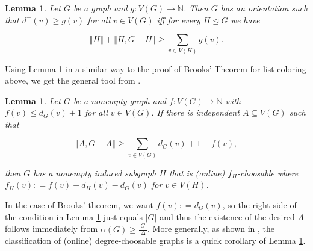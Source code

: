 \documentclass[12pt]{amsart}
\theoremstyle{plain}
\newtheorem{lem}[thm]{Lemma}
\theoremstyle{definition}
\theoremstyle{remark}
\newcommand{\IN}{\mathbb{N}}
\newcommand{\size}[1]{\left\Vert#1\right\Vert}
\newcommand{\func}[3]{#1\colon #2 \rightarrow #3}
\newcommand{\DefinedAs}{\mathrel{\mathop:}=}
\begin{document}
\begin{lem}\label{InOrientations}
Let $G$ be a graph and $\func{g}{V(G)}{\IN}$.  Then $G$ has an orientation such that $d^-(v) \geq g(v)$ for all $v \in V(G)$ iff for every $H \unlhd G$ we have

\[\size{H} + \size{H, G-H} \ge \sum_{v \in V(H)} g(v).\]
\end{lem}

Using Lemma \ref{InOrientations} in a similar way to the proof of Brooks' Theorem for list coloring above, we get the general tool from \cite{orevizing}.

\begin{lem}\label{SecondStrengtheningMic}
Let $G$ be a nonempty graph and $\func{f}{V(G)}{\IN}$ with $f(v) \leq d_G(v) + 1$ for all $v \in V(G)$. If there is independent $A \subseteq V(G)$ such that

\[\size{A, G-A} \ge  \sum_{v \in V(G)} d_G(v) + 1 - f(v),\]

\noindent then $G$ has a nonempty induced subgraph $H$ that is (online) $f_H$-choosable where $f_H(v) \DefinedAs f(v) + d_H(v) - d_G(v)$ for $v \in V(H)$.
\end{lem}

In the case of Brooks' theorem, we want $f(v) \DefinedAs d_G(v)$, so the right side of the condition in Lemma \ref{SecondStrengtheningMic} just equals $|G|$ and thus the existence of the desired $A$ follows immediately from
$\alpha(G) \ge \frac{|G|}{\Delta}$.  More generally, as shown in \cite{orevizing}, the classification of (online) degree-choosable graphs is a quick corollary of Lemma \ref{SecondStrengtheningMic}.
\end{document}
